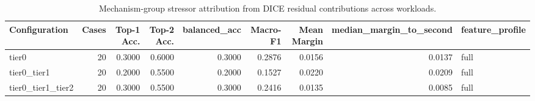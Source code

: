 \begin{table}[t]
\centering
\caption{Mechanism-group stressor attribution from DICE residual contributions across workloads.}
\label{tab:dice_stressor_diagnosis}
\footnotesize
\begin{tabular}{lrrrrrrrl}
\toprule
Configuration & Cases & Top-1 Acc. & Top-2 Acc. & balanced_acc & Macro-F1 & Mean Margin & median_margin_to_second & feature_profile \\
\midrule
tier0 & 20 & 0.3000 & 0.6000 & 0.3000 & 0.2876 & 0.0156 & 0.0137 & full \\
tier0_tier1 & 20 & 0.2000 & 0.5500 & 0.2000 & 0.1527 & 0.0220 & 0.0209 & full \\
tier0_tier1_tier2 & 20 & 0.3000 & 0.5500 & 0.3000 & 0.2416 & 0.0135 & 0.0085 & full \\
\bottomrule
\end{tabular}

\end{table}
